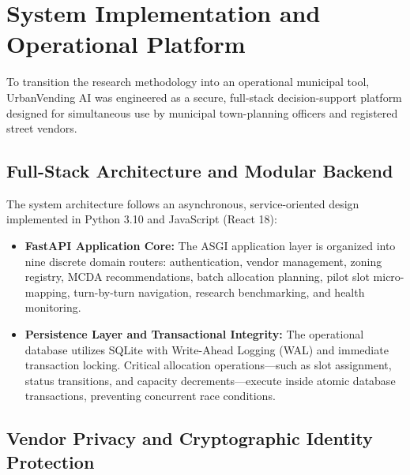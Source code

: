 \section{System Implementation and Operational Platform}
\label{sec:implementation}

To transition the research methodology into an operational municipal tool, UrbanVending AI was engineered as a secure, full-stack decision-support platform designed for simultaneous use by municipal town-planning officers and registered street vendors.

\subsection{Full-Stack Architecture and Modular Backend}
\label{sec:impl_arch}

The system architecture follows an asynchronous, service-oriented design implemented in Python 3.10 and JavaScript (React 18):
\begin{itemize}
    \item \textbf{FastAPI Application Core:} The ASGI application layer is organized into nine discrete domain routers: authentication, vendor management, zoning registry, MCDA recommendations, batch allocation planning, pilot slot micro-mapping, turn-by-turn navigation, research benchmarking, and health monitoring.
    \item \textbf{Persistence Layer and Transactional Integrity:} The operational database utilizes SQLite with Write-Ahead Logging (WAL) and immediate transaction locking. Critical allocation operations—such as slot assignment, status transitions, and capacity decrements—execute inside atomic database transactions, preventing concurrent race conditions.
\end{itemize}

\subsection{Vendor Privacy and Cryptographic Identity Protection}
\label{sec:impl_privacy}

